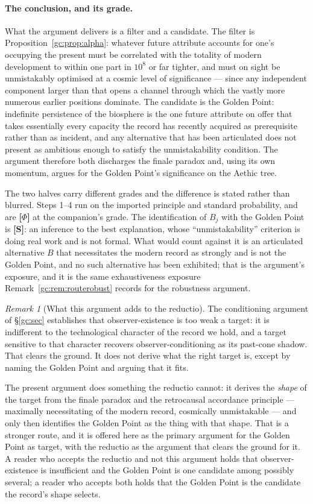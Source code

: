 \documentclass[11pt]{article}
\numberwithin{equation}{section}
\theoremstyle{plain}
\theoremstyle{definition}
\theoremstyle{remark}
\newtheorem{remark}[theorem]{Remark}
\begin{document}
\paragraph{The conclusion, and its grade.} What the argument delivers is
a filter and a candidate. The filter is
Proposition~\ref{gc:prop:alpha}: whatever future attribute accounts for
one's occupying the present must be correlated with the totality of
modern development to within one part in $10^{8}$ or far tighter, and
must on sight be unmistakably optimised at a cosmic level of
significance --- since any independent component larger than that opens
a channel through which the vastly more numerous earlier positions
dominate. The candidate is the Golden Point: indefinite persistence of
the biosphere is the one future attribute on offer that takes
essentially every capacity the record has recently acquired as
prerequisite rather than as incident, and any alternative that has been
articulated does not present as ambitious enough to satisfy the
unmistakability condition. The argument therefore both discharges the
finale paradox and, using its own momentum, argues for the Golden
Point's significance on the Aethic tree.

The two halves carry different grades and the difference is stated
rather than blurred. Steps 1--4 run on the imported principle and
standard probability, and are \textbf{[$\Phi$]} at the companion's
grade. The identification of $B_j$ with the Golden Point is
\textbf{[S]}: an inference to the best explanation, whose
``unmistakability'' criterion is doing real work and is not formal. What
would count against it is an articulated alternative $B$ that
necessitates the modern record as strongly and is not the Golden Point,
and no such alternative has been exhibited; that is the argument's
exposure, and it is the same exhaustiveness exposure
Remark~\ref{gc:rem:routerobust} records for the robustness argument.

\begin{remark}[What this argument adds to the reductio]\label{ra:rem:spine}
The conditioning argument of \S\ref{gc:sec} establishes that
observer-existence is too weak a target: it is indifferent to the
technological character of the record we hold, and a target sensitive to
that character recovers observer-conditioning as its past-cone shadow.
That clears the ground. It does not derive what the right target is,
except by naming the Golden Point and arguing that it fits.

The present argument does something the reductio cannot: it derives the
\emph{shape} of the target from the finale paradox and the retrocausal
accordance principle --- maximally necessitating of the modern record,
cosmically unmistakable --- and only then identifies the Golden Point as
the thing with that shape. That is a stronger route, and it is offered
here as the primary argument for the Golden Point as target, with the
reductio as the argument that clears the ground for it. A reader who
accepts the reductio and not this argument holds that observer-existence
is insufficient and the Golden Point is one candidate among possibly
several; a reader who accepts both holds that the Golden Point is the
candidate the record's shape selects.
\end{remark}
\end{document}

